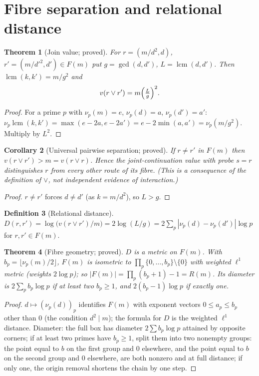 \documentclass[11pt,a4paper]{article}
\newtheorem{theorem}{Theorem}[section]
\newtheorem{corollary}[theorem]{Corollary}
\theoremstyle{definition}
\newtheorem{definition}[theorem]{Definition}
\newcommand{\lcm}{\operatorname{lcm}}
\newcommand{\vj}{\mathbin{\vee}}
\begin{document}
\section{Fibre separation and relational distance}
\begin{theorem}[Join value; proved]\label{thm:join}
For $r=(m/d^2,d)$, $r'=(m/d'^2,d')\in F(m)$ put $g=\gcd(d,d')$, $L=\lcm(d,d')$. Then $\lcm(k,k')=m/g^2$ and
\[ v(r\vj r') = m\Bigl(\tfrac{L}{g}\Bigr)^{2}. \]
\end{theorem}
\begin{proof}
For a prime $p$ with $\nu_p(m)=e$, $\nu_p(d)=a$, $\nu_p(d')=a'$: $\nu_p\lcm(k,k')=\max(e-2a,e-2a')=e-2\min(a,a')=\nu_p(m/g^2)$. Multiply by $L^2$.
\end{proof}
\begin{corollary}[Universal pairwise separation; proved]\label{cor:sep}
If $r\ne r'$ in $F(m)$ then $v(r\vj r')>m=v(r\vj r)$. Hence the joint-continuation value with probe $s=r$ distinguishes $r$ from every other route of its fibre. (This is a consequence of the definition of $\vj$, not independent evidence of interaction.)
\end{corollary}
\begin{proof}
$r\neq r'$ forces $d\ne d'$ (as $k=m/d^2$), so $L>g$.
\end{proof}

\begin{definition}[Relational distance]
$D(r,r')=\log\bigl(v(r\vj r')/m\bigr)=2\log(L/g)=2\sum_p|\nu_p(d)-\nu_p(d')|\log p$ for $r,r'\in F(m)$.
\end{definition}
\begin{theorem}[Fibre geometry; proved]\label{thm:geom}
$D$ is a metric on $F(m)$. With $b_p=\lfloor \nu_p(m)/2\rfloor$, $F(m)$ is isometric to $\prod_p\{0,\dots,b_p\}\setminus\{0\}$ with weighted $\ell^1$ metric (weights $2\log p$); so $|F(m)|=\prod_p(b_p+1)-1=R(m)$. Its diameter is $2\sum_p b_p\log p$ if at least two $b_p\ge1$, and $2(b_p-1)\log p$ if exactly one.
\end{theorem}
\begin{proof}
$d\mapsto(\nu_p(d))_p$ identifies $F(m)$ with exponent vectors $0\le a_p\le b_p$ other than $0$ (the condition $d^2\mid m$); the formula for $D$ is the weighted $\ell^1$ distance. Diameter: the full box has diameter $2\sum b_p\log p$ attained by opposite corners; if at least two primes have $b_p\ge1$, split them into two nonempty groups: the point equal to $b$ on the first group and $0$ elsewhere, and the point equal to $b$ on the second group and $0$ elsewhere, are both nonzero and at full distance; if only one, the origin removal shortens the chain by one step.
\end{proof}
\end{document}

